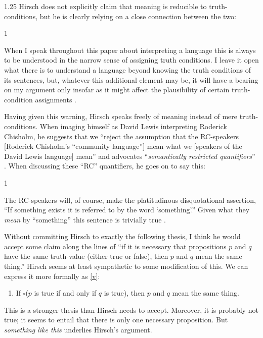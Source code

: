 \documentclass[11pt]{article}
\newenvironment{squote}{%
\begin{spacing}{1}
       	\begin{list}{}{%
\setlength{\labelwidth}{0pt}%
\rightmargin\leftmargin%
}
\item\relax
}{%
\end{list}%
\end{spacing}
}
\begin{document}
\begin{spacing}{1.25}
Hirsch does not explicitly claim that meaning is reducible to
truth-conditions, but he is clearly relying on a close connection
between the two:

\begin{squote}
When I speak throughout this paper about interpreting a language this
is always to be understood in the narrow sense of assigning truth
conditions.  I leave it open what there is to understand a language
beyond knowing the truth conditions of its sentences, but, whatever
this additional element may be, it will have a bearing on my argument
only insofar as it might affect the plausibility of certain
truth-condition assignments \citeyearpar[72]{hirsch2005}.
\end{squote}

Having given this warning, Hirsch speaks freely of meaning instead of
mere truth-conditions.  When imaging himself as David Lewis
interpreting Roderick Chisholm, he suggests that we ``reject the
assumption that the RC-speakers [Roderick Chisholm's ``community
  language''] mean what we [speakers of the David Lewis language]
mean'' \citeyearpar[76]{hirsch2005} and advocates ``{\em semantically
  restricted quantifiers}'' \citeyearpar[76, his
  emphasis]{hirsch2005}.  When discussing these ``RC'' quantifiers, he
goes on to say this:

\begin{squote}
The RC-speakers will, of course, make the platitudinous disquotational
assertion, ``If something exists it is referred to by the word
`something'.''  Given what they {\em mean} by ``something'' this
sentence is trivially true \citeyearpar[77, my emphasis]{hirsch2005}.
\end{squote}

Without committing Hirsch to exactly the following thesis, I think he
would accept some claim along the lines of ``if it is necessary that
propositions $p$ and $q$ have the same truth-value (either true or
false), then $p$ and $q$ mean the same thing.''  Hirsch seems at least
sympathetic to some modification of this.  We can express it more
formally as \ref{v}:
\begin{enumerate}[itemindent=25pt, label=(M)]
    \item If $\square$($p$ is true if and only if $q$ is true), then
      $p$ and $q$ mean the same thing. \label{v}
\end{enumerate}

This is a stronger thesis than Hirsch needs to accept.  Moreover, it
is probably not true; it seems to entail that there is only one
necessary proposition.  But {\em something like this} underlies
Hirsch's argument.


\end{spacing}
\end{document}
